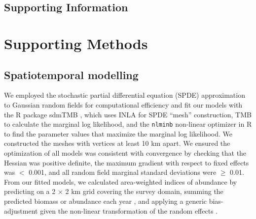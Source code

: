 \documentclass[12pt]{article}
\begin{document}
\onehalfspacing
\linenumbers
\resetlinenumber
\setcounter{page}{1}
\setcounter{equation}{0}
\nolinenumbers

\begin{Center}
\section*{Supporting Information}
\end{Center}

\section*{Supporting Methods}

\subsection*{Spatiotemporal modelling}

We employed the stochastic partial differential equation (SPDE) approximation to Gaussian random fields for computational efficiency and fit our models with the \textsf{R} package sdmTMB \citep{anderson2022}, which uses INLA \citep{lindgren2015} for SPDE ``mesh'' construction, TMB \citep{kristensen2016} to calculate the marginal log likelihood, and the \texttt{nlminb} non-linear optimizer in R \citep{r2023} to find the parameter values that maximize the marginal log likelihood.
We constructed the meshes with vertices at least 10 km apart.
We ensured the optimization of all models was consistent with convergence by checking that the Hessian was positive definite, the maximum gradient with respect to fixed effects was $<$ 0.001, and all random field marginal standard deviations were $\ge$ 0.01.
From our fitted models, we calculated area-weighted indices of abundance by predicting on a 2 $\times$ 2 km grid covering the survey domain, summing the predicted biomass or abundance each year \citep{thorson2015a}, and applying a generic bias-adjustment given the non-linear transformation of the random effects \citep{thorson2016bias}.
\end{document}
